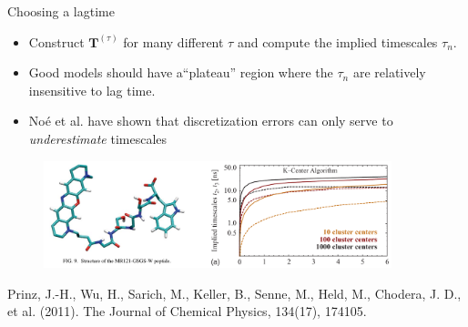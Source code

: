 \documentclass{beamer}
\begin{document}
\begin{frame}{Choosing a lagtime}
\begin{itemize}
    \item Construct $\mathbf{T}^{(\tau)}$ for many different $\tau$ and compute the implied timescales $\tau_n$.
    \item Good models should have a``plateau'' region where the $\tau_n$ are relatively insensitive to lag time.
    \item No\'e et al. have shown that discretization errors can only serve to \textit{underestimate} timescales
\end{itemize}
\begin{figure}
\includegraphics[width=0.9\textwidth]{MR121-GSGS-W}
\end{figure}

\tiny
 Prinz, J.-H., Wu, H., Sarich, M., Keller, B., Senne, M., Held, M., Chodera, J. D., et al. (2011). The Journal of Chemical Physics, 134(17), 174105.
\normalsize

\end{frame}
\end{document}
